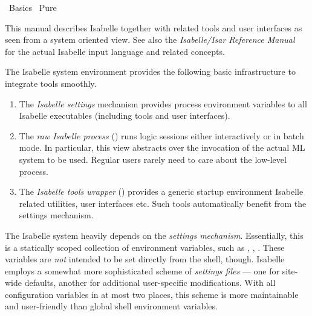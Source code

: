 %
\begin{isabellebody}%
\def\isabellecontext{Basics}%
%
\isadelimtheory
\isanewline
\isanewline
%
\endisadelimtheory
%
\isatagtheory
{}\isamarkupfalse%
\ Basics\isanewline
{}\ Pure\isanewline
{}%
\endisatagtheory
{\isafoldtheory}%
%
\isadelimtheory
%
\endisadelimtheory
%
\isamarkuptrue%
%
\begin{isamarkuptext}%
This manual describes Isabelle together with related tools and user
  interfaces as seen from a system oriented view.  See also the
  \emph{Isabelle/Isar Reference Manual}~\cite{isabelle-isar-ref} for
  the actual Isabelle input language and related concepts.

  \medskip The Isabelle system environment provides the following
  basic infrastructure to integrate tools smoothly.

  \begin{enumerate}

  \item The \emph{Isabelle settings} mechanism provides process
  environment variables to all Isabelle executables (including tools
  and user interfaces).

  \item The \emph{raw Isabelle process} (\hyperlink{executable.isabelle-process}{\mbox{}}) runs logic sessions either interactively or in
  batch mode.  In particular, this view abstracts over the invocation
  of the actual ML system to be used.  Regular users rarely need to
  care about the low-level process.

  \item The \emph{Isabelle tools wrapper} (\hyperlink{executable.isabelle}{\mbox{}})
  provides a generic startup environment Isabelle related utilities,
  user interfaces etc.  Such tools automatically benefit from the
  settings mechanism.

  \end{enumerate}%
\end{isamarkuptext}%
\isamarkuptrue%
%
\isamarkuptrue%
%
\begin{isamarkuptext}%
The Isabelle system heavily depends on the \emph{settings
  mechanism}.  Essentially, this is a statically
  scoped collection of environment variables, such as \hyperlink{setting.ISABELLE-HOME}{\mbox{}}, \hyperlink{setting.ML-SYSTEM}{\mbox{}}, \hyperlink{setting.ML-HOME}{\mbox{}}.  These
  variables are \emph{not} intended to be set directly from the shell,
  though.  Isabelle employs a somewhat more sophisticated scheme of
  \emph{settings files} --- one for site-wide defaults, another for
  additional user-specific modifications.  With all configuration
  variables in at most two places, this scheme is more maintainable
  and user-friendly than global shell environment variables.


\end{isamarkuptext}
\end{isabellebody}
